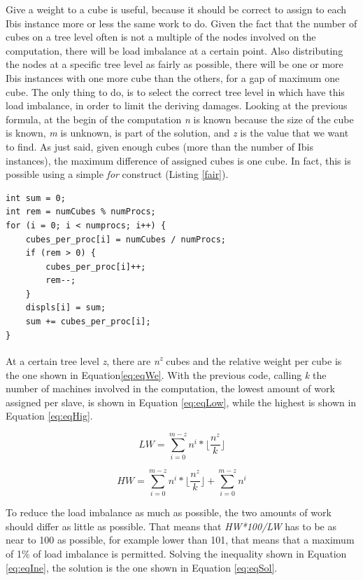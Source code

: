 \documentclass[a4paper]{article}
\begin{document}
Give a weight to a cube is useful, because it should be correct to assign to each Ibis instance more or less the same work to do. Given the fact that the number of cubes on a tree level often is not a multiple of the nodes involved on the computation, there will be load imbalance at a certain point. Also distributing the nodes at a specific tree level as fairly as possible, there will be one or more Ibis instances with one more cube than the others, for a gap of maximum one cube. The only thing to do, is to select the correct tree level in which have this load imbalance, in order to limit the deriving damages. Looking at the previous formula, at the begin of the computation \textit{n} is known because the size of the cube is known, \textit{m} is unknown, is part of the solution, and \textit{z} is the value that we want to find. As just said, given enough cubes (more than the number of Ibis instances), the maximum difference of assigned cubes is one cube. In fact, this is possible using a simple \textit{for} construct (Listing \ref{fair}).

\begin{lstlisting}[label=fair, caption=fair distribution of cubes]
int sum = 0;
int rem = numCubes % numProcs; 
for (i = 0; i < numprocs; i++) {
    cubes_per_proc[i] = numCubes / numProcs;
    if (rem > 0) {
        cubes_per_proc[i]++;
        rem--;
    }
    displs[i] = sum;
    sum += cubes_per_proc[i];
}
\end{lstlisting}
\FloatBarrier

At a certain tree level \textit{z}, there are \textit{n\textsuperscript{z}} cubes and the relative weight per cube is the one shown in Equation\ref{eq:eqWe}. With the previous code, calling \textit{k} the number of machines involved in the computation, the lowest amount of work assigned per slave, is shown in Equation \ref{eq:eqLow}, while the highest is shown in Equation \ref{eq:eqHig}. 

\begin{equation} 
\label{eq:eqLow}
LW=\sum_{i=0}^{m-z}{n^i}*\lfloor\frac{n^z}{k}\rfloor
\end{equation}
\FloatBarrier

\begin{equation} 
\label{eq:eqHig}
HW=\sum_{i=0}^{m-z}{n^i}*\lfloor\frac{n^z}{k}\rfloor +  \sum_{i=0}^{m-z}{n^i}
\end{equation}
\FloatBarrier

To reduce the load imbalance as much as possible, the two amounts of work should differ as little as possible. That means that \textit{HW*100/LW} has to be as near to 100 as possible, for example lower than 101, that means that a maximum of 1\% of load imbalance is permitted. Solving the inequality shown in Equation \ref{eq:eqIne}, the solution is the one shown in Equation \ref{eq:eqSol}. 
\end{document}
